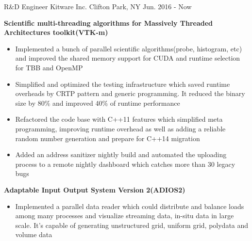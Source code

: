 

\begin{cventries}

  \cventry
    {R\&D Engineer} %
    {Kitware Inc.} %
    {Clifton Park, NY} %
    {Jun. 2016 - Now} %
    {
      \begin{cvitems} %
        \item {\fontsize{10pt}{1em}\bodyfont\bfseries\color{darktext}Scientific multi-threading algorithms for Massively Threaded Architectures toolkit(VTK-m)}
          \begin{itemize}
              \item {Implemented a bunch of parallel scientific algorithms(probe, histogram, etc) and improved the shared memory support for CUDA and runtime selection for TBB and OpenMP}
              \item {Simplified and optimized the testing infrastructure which saved runtime overheads by CRTP pattern and generic programming. It reduced the binary size by 80\% and improved 40\% of runtime performance}
              \item {Refactored the code base with C++11 features which simplified meta programming, improving runtime overhead as well as adding a reliable random number generation and prepare for C++14 migration}
              \item {Added an address sanitizer nightly build and automated the uploading process to a remote nightly dashboard which catches more than 30 legacy bugs}
          \end{itemize}
        \item {\fontsize{10pt}{1em}\bodyfont\bfseries\color{darktext}Adaptable Input Output System Version 2(ADIOS2)}
          \begin{itemize}
            \item {Implemented a parallel data reader which could distribute and balance loads among many processes and visualize streaming data, in-situ data in large scale. It's capable of generating unstructured grid, uniform grid, polydata and volume data}

\end{itemize}
\end{cvitems}}
\end{cventries}
